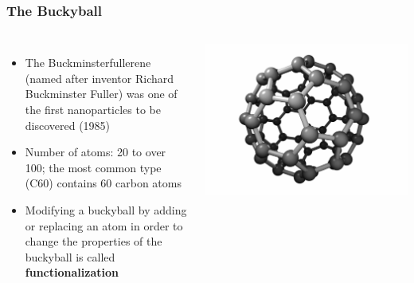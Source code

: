 \documentclass{beamer}
\begin{document}
\begin{frame}
	\frametitle{The Buckyball}
	\begin{columns}
		\begin{itemize}
			\item The Buckminsterfullerene (named after inventor Richard Buckminster Fuller) was one of the first nanoparticles to be discovered (1985)
			
			\item Number of atoms: 20 to over 100; the most common type (C60) contains 60 carbon atoms
					
			\item Modifying a buckyball by adding or replacing an atom in order to change the properties of the buckyball is called \textbf{functionalization}
		\end{itemize}
		\includegraphics[scale=.2]{buckyball_white}
	\end{columns}
\end{frame}
\end{document}
